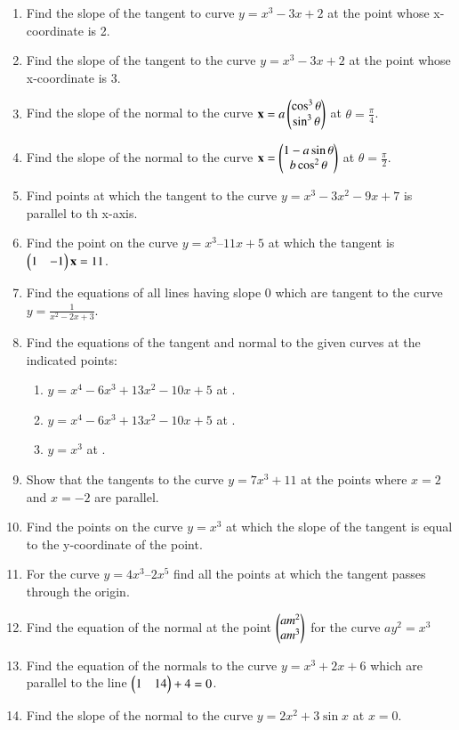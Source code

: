 \begin{enumerate}[label=\arabic*.,ref=\thesubsection.\theenumi]
\item Find the slope of the tangent to curve $y = x^3-3x+2$ at the point whose 
x-coordinate is 2.
\item Find the slope of the tangent to the curve $y = x^3-3x+2 $ at the point whose x-coordinate is 3.
\item Find the slope of the normal to the curve 
$
\mathbf{x} = a \begin{pmatrix}\cos^3\theta \\ \sin^{3}\theta\end{pmatrix}
$
at $\theta = \frac{\pi}{4}$.
\item Find the slope of the normal to the curve 
$
\mathbf{x} =  \begin{pmatrix}1-a\sin\theta \\ b\cos^{2}\theta\end{pmatrix}
$
at $\theta = \frac{\pi}{2}$.
\item Find points at which the tangent to the curve $y = x^3-3x^2-9x+7$ is parallel to th x-axis.
\item Find the point on the curve $y = x^3– 11x + 5$
at which the tangent is $\begin{pmatrix}1 & -1\end{pmatrix}\mathbf{x} =  11$.
\item Find the equations of all lines having slope 0 which are tangent to the curve 
$
y = \frac{1}{x^2-2x+3}
$.
\item Find the equations of the tangent and normal to the given curves at the indicated points: 
%
\begin{enumerate}
\item
$
y= x^4 - 6x^3+13x^2-10x+5
$
at .
\item
$
y = x^4 - 6x^3+13x^2-10x+5
$
at .
\item
$
y = x^3
$
at .
\end{enumerate}
%
\item Show that the tangents to the curve $y = 7x^3 + 11$ at the points where $x = 2$ and $x = -2$ are parallel.
\item Find the points on the curve $y = x^3$  at which the slope of the tangent is equal to the y-coordinate of the point.
\item For the curve $y = 4x^3 – 2x^5$ find all the points at which the tangent passes through the origin.
\item Find the equation of the normal at the point $\begin{pmatrix}am^2 \\ am^3\end{pmatrix}$  for the curve $ay^2 = x^3$
\item Find the equation of the normals to the curve $y = x^3+2x+6$ which are parallel to the line $\begin{pmatrix}1 & 14\end{pmatrix} + 4 = 0$.
\item Find the slope of the normal to the curve $y = 2x^2 + 3 \sin x$ at $x = 0$.

\end{enumerate}
